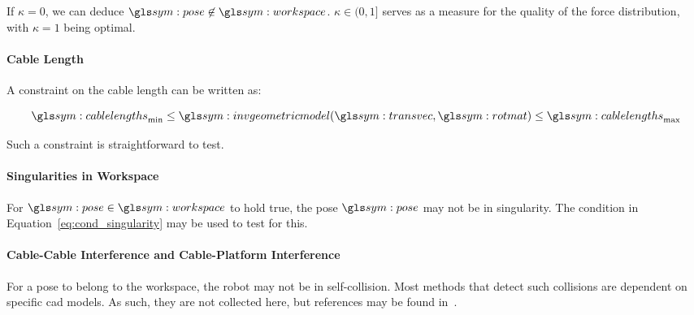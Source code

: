 				If	$\kappa  =	0$,  we  can  deduce  $\pose  \not\in
				\workspace$.  $\kappa \in (0, 1]$ serves as a measure for the
				quality of the force distribution, with $\kappa = 1$ being
				optimal.

			\paragraph{Cable Length}%
			\label{sec:cable_length}

				A constraint on the cable length can be written as:

				\begin{equation}
					\cablelengths_{\min}
						\leq \invgeometricmodel(\transvec, \rotmatbare)
						\leq \cablelengths_{\max}
				\end{equation}


				Such a constraint is straightforward to test.


			\paragraph{Singularities in Workspace}%
			\label{sec:singularities_in_workspace}

				For $\pose\in\workspace$ to hold true, the pose $\pose$ may not
				be in singularity. The condition in
				Equation~\ref{eq:cond_singularity} may be used to test for this.

			\paragraph{Cable-Cable Interference and Cable-Platform Interference}%
			\label{sec:cable_cable_interference_and_cable_platform_interference}

				For a pose to belong to the workspace, the robot may not be in
				self-collision. Most methods that detect such collisions are
				dependent on specific \gls{cad} models. As such, they are not
				collected here, but references may be found in~\cite[][page
				171]{bib:cdpr:cable_driven_parallel_robots_theory_and_application}.

